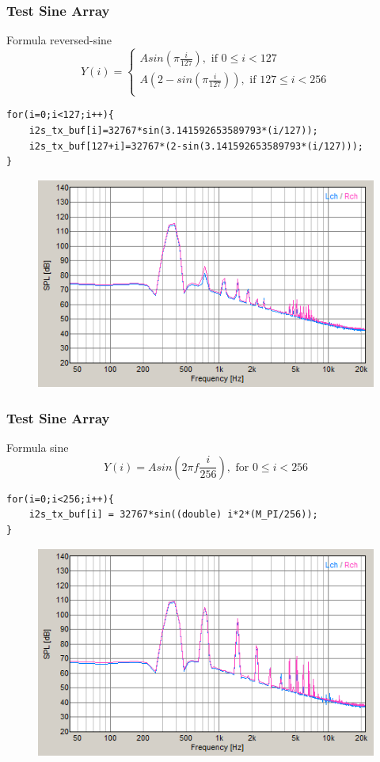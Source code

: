 \documentclass[table,dvipsnames,10pt]{beamer}
\begin{document}
	\begin{frame}[fragile]
	\frametitle{Test Sine Array}
	\begin{exampleblock}{Formula reversed-sine}
		\[
		Y(i) =
		\begin{cases}
		A sin(\pi \frac{i}{127}), \text{ if } 0 \leq i < 127\\
		A(2-sin(\pi \frac{i}{127})), \text{ if } 127 \leq i < 256\\
		\end{cases}
		\]
	\end{exampleblock}
	\begin{exampleblock}{}
		\begin{verbatim}
for(i=0;i<127;i++){
	i2s_tx_buf[i]=32767*sin(3.141592653589793*(i/127));
	i2s_tx_buf[127+i]=32767*(2-sin(3.141592653589793*(i/127)));
}
		\end{verbatim}
	\end{exampleblock}
	\begin{exampleblock}{}
		\begin{figure}[H]
			\centering
			\includegraphics[width=0.45\linewidth]{result/day_1/halfMax256}
		\end{figure}
	\end{exampleblock}
	\end{frame}

	\begin{frame}[fragile]
	\frametitle{Test Sine Array}
	\begin{exampleblock}{Formula sine}
		\[ Y(i) = A sin(2\pi f \frac{i}{256}), \text{ for } 0 \leq i < 256 \]
	\end{exampleblock}
	\begin{exampleblock}{}
		\begin{verbatim}
for(i=0;i<256;i++){
	i2s_tx_buf[i] = 32767*sin((double) i*2*(M_PI/256));
}
		\end{verbatim}
	\end{exampleblock}
	\begin{exampleblock}{}
		\begin{figure}[H]
			\centering
			\includegraphics[width=0.45\linewidth]{result/day_1/Max256}
		\end{figure}
	\end{exampleblock}
	\end{frame}
\end{document}
